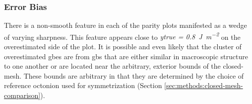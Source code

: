 \documentclass[preprint,12pt]{elsarticle}
\begin{document}
\subsubsection{Error Bias} \label{results:general:bias}
There is a non-smooth feature in each of the parity plots manifested as a wedge of varying sharpness. This feature appears close to \textit{ytrue = \SI{0.8}{\J\per\square\meter}} on the overestimated side of the plot. It is possible and even likely that the cluster of overestimated \glspl{gbe} are from \glspl{gb} that are either similar in macroscopic structure to one another or are located near the arbitrary, exterior bounds of the closed-mesh. These bounds are arbitrary in that they are determined by the choice of reference octonion used for symmetrization (Section \ref{sec:methods:closed-mesh-comparison}).
    
\end{document}
